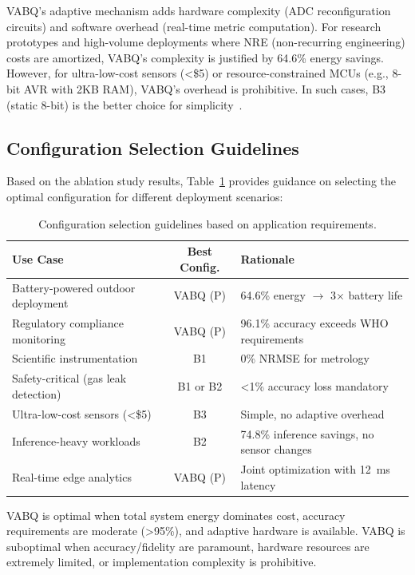 VABQ's adaptive mechanism adds hardware complexity (ADC reconfiguration circuits) and software overhead (real-time metric computation). For research prototypes and high-volume deployments where NRE (non-recurring engineering) costs are amortized, VABQ's complexity is justified by 64.6\% energy savings. However, for ultra-low-cost sensors (<\$5) or resource-constrained MCUs (e.g., 8-bit AVR with 2KB RAM), VABQ's overhead is prohibitive. In such cases, B3 (static 8-bit) is the better choice for simplicity~\cite{ultralow2023}.

\subsection{Configuration Selection Guidelines}
\label{sec:disc_selection}

Based on the ablation study results, Table~\ref{tab:config_selection} provides guidance on selecting the optimal configuration for different deployment scenarios:

\begin{table}[h]
\centering
\caption{Configuration selection guidelines based on application requirements.}
\label{tab:config_selection}
\begin{tabular}{@{}p{4cm}cp{5cm}@{}}
\toprule
\textbf{Use Case} & \textbf{Best Config.} & \textbf{Rationale} \\
\midrule
Battery-powered outdoor deployment & VABQ (P) & 64.6\% energy $\rightarrow$ 3$\times$ battery life \\
Regulatory compliance monitoring & VABQ (P) & 96.1\% accuracy exceeds WHO requirements \\
Scientific instrumentation & B1 & 0\% NRMSE for metrology \\
Safety-critical (gas leak detection) & B1 or B2 & <1\% accuracy loss mandatory \\
Ultra-low-cost sensors (<\$5) & B3 & Simple, no adaptive overhead \\
Inference-heavy workloads & B2 & 74.8\% inference savings, no sensor changes \\
Real-time edge analytics & VABQ (P) & Joint optimization with 12~ms latency \\
\bottomrule
\end{tabular}
\end{table}

VABQ is optimal when total system energy dominates cost, accuracy requirements are moderate (>95\%), and adaptive hardware is available. VABQ is suboptimal when accuracy/fidelity are paramount, hardware resources are extremely limited, or implementation complexity is prohibitive.

